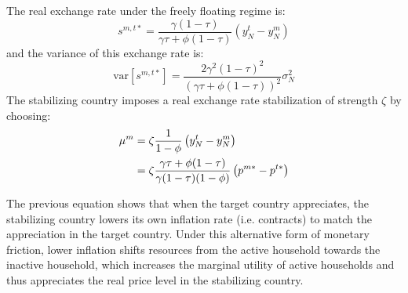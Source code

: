 The real exchange rate under the freely floating regime is:
\begin{equation*}
  s^{m, t \ast} 
  = \frac{\gamma (1 - \tau)}{\gamma \tau + \phi (1 - \tau)}
  \left( y^t_N - y^m_N \right)
\end{equation*}
and the variance of this exchange rate is:
\begin{equation*}
  \text{var}\left[ s^{m, t \ast} \right]
  = \frac{2 \gamma^2 (1 - \tau)^2}{\left( \gamma \tau + \phi (1 - \tau) \right)^2}
  \sigma_N^2
\end{equation*}
The stabilizing country imposes a real exchange rate stabilization of
strength $\zeta$ by choosing:
\begin{align}
  \mu^m
  & = \zeta \frac{1}{1 - \phi} \left( y^t_N - y^m_N \right) \notag \\
  & = \zeta \frac{\gamma \tau + \phi (1 - \tau)}{\gamma (1 - \tau)(1 - \phi)}
    \left( p^{m \ast}  - p^{t \ast} \right) 
\end{align}

The previous equation shows that when the target country appreciates,
the stabilizing country lowers its own inflation rate (i.e. contracts)
to match the appreciation in the target country. Under this
alternative form of monetary friction, lower inflation shifts
resources from the active household towards the inactive household,
which increases the marginal utility of active households and thus
appreciates the real price level in the stabilizing country.

